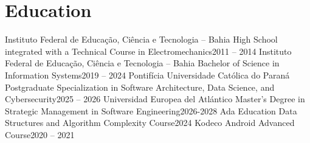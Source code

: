 \section{Education}
  \resumeSubHeadingListStart
    \resumeSubheading
      {Instituto Federal de Educação, Ciência e Tecnologia – Bahia}{}
      {High School integrated with a Technical Course in Electromechanics}{2011 -- 2014}
    \resumeSubheading
      {Instituto Federal de Educação, Ciência e Tecnologia – Bahia}{}
      {Bachelor of Science in Information Systems}{2019 -- 2024}
    \resumeSubheading
      {Pontifícia Universidade Católica do Paraná}{}
      {Postgraduate Specialization in Software Architecture, Data Science, and Cybersecurity}{2025 -- 2026}
    \resumeSubheading
      {Universidad Europea del Atlántico}{}
      {Master's Degree in Strategic Management in Software Engineering}{2026-2028}
    \resumeSubheading
      {Ada Education}{}
      {Data Structures and Algorithm Complexity Course}{2024}
    \resumeSubheading
      {Kodeco}{}
      {Android Advanced Course}{2020 -- 2021}
  \resumeSubHeadingListEnd
